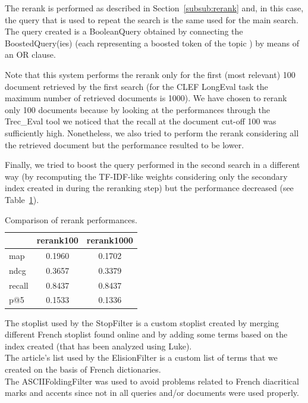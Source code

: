 \par
The rerank is performed as described in Section~\ref{subsub:rerank} and, in this case, the query that is used to repeat the search is the same used for the main search. The query created is a BooleanQuery obtained by connecting the BoostedQuery(ies) (each representing a boosted token of the topic ) by means of an OR clause.
\par
Note that this system performs the rerank only for the first (most relevant) 100 document retrieved by the first search (for the CLEF LongEval task the maximum number of retrieved documents is 1000). We have chosen to rerank only 100 documents because by looking at the performances through the Trec\_Eval tool we noticed that the recall at the document cut-off 100 was sufficiently high. Nonetheless, we also tried to perform the rerank considering all the retrieved document but the performance resulted to be lower. 
\par
Finally, we tried to boost the query performed in the second search in a different way (by recomputing the TF-IDF-like weights considering only the secondary index created in during the reranking step) but the performance decreased (see Table~\ref{tab:rerankperf}).

\begin{center}
\begin{table}[tb]
\centering
\begin{tabular}{|l|c|c|} 
 \hline
   & rerank100 & rerank1000  \\
 \hline\hline
 map & 0.1960 & 0.1702 \\ 
 ndcg & 0.3657 & 0.3379  \\
 recall & 0.8437 & 0.8437 \\
 p@5 & 0.1533 & 0.1336 \\ 
 \hline
\end{tabular}
\caption{Comparison of rerank performances.}
\label{tab:rerankperf}
\end{table}
\end{center}
\par
The stoplist used by the StopFilter is a custom stoplist created by merging different French stoplist found online and by adding some terms based on the index created (that has been analyzed using Luke).\\
The article’s list used by the ElisionFilter is a custom list of terms that we created on the basis of French dictionaries.\\
The ASCIIFoldingFilter was used to avoid problems related to French diacritical marks and accents since not in all queries and/or documents were used properly.

